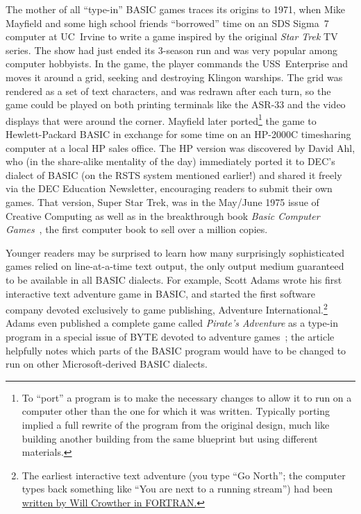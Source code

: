 The mother of all ``type-in'' BASIC games traces its origins to
1971, when Mike Mayfield and some high school friends ``borrowed'' time
on an SDS Sigma~7 computer at UC~Irvine to write a game inspired by the
original \emph{Star Trek} TV series.  The show had just ended its 3-season run and
was very popular among computer hobbyists.
In the game, the player commands the USS~Enterprise and moves it around
a grid, seeking and destroying Klingon warships.  The grid was rendered
as a set of text characters, and was redrawn after each turn, so
the game could be played on both printing terminals like the ASR-33 and
the video displays that were around the corner.
Mayfield later ported\footnote{To ``port'' a program is to make the
  necessary changes to allow it to run on a computer other than the
  one for which it was written.  Typically porting implied a full
  rewrite of the program from the original design, much like building another building from the
  same blueprint but using different materials.}
the game to Hewlett-Packard BASIC in exchange for
some time on an HP-2000C timesharing computer at a local HP sales
office.
The HP version was discovered by David Ahl, who (in the share-alike mentality of the day)
immediately ported it to DEC's dialect of BASIC  (on the RSTS system
mentioned earlier!) and shared it freely via the DEC
Education Newsletter, encouraging readers to submit their own games.
That version, Super Star Trek, was
in the May/June 1975 issue of Creative Computing as well as in the
breakthrough book \emph{Basic Computer Games}~\cite{basic_computer_games}, the first computer book
to sell over a million copies.


Younger readers may be surprised to learn how many 
surprisingly sophisticated games relied on line-at-a-time text output,
the only output medium guaranteed to be available in all BASIC dialects.
For example, Scott Adams wrote his first interactive text adventure game
in BASIC, and started
the first software company devoted exclusively to game publishing,
Adventure International.\footnote{The earliest interactive text adventure (you type
``Go North''; the computer types back something like ``You are next to a
running stream'') had been
\href{https://armandofox.blogspot.com/2007/08/the-original-original-adventure.html}{written by Will Crowther in FORTRAN.}}
Adams even published a complete game called \emph{Pirate's Adventure} as
a type-in program in a special issue of BYTE devoted to adventure
games~\cite{byte80:adventure}; the article helpfully notes which parts
of the BASIC program would have to be changed to run on other
Microsoft-derived BASIC dialects.

